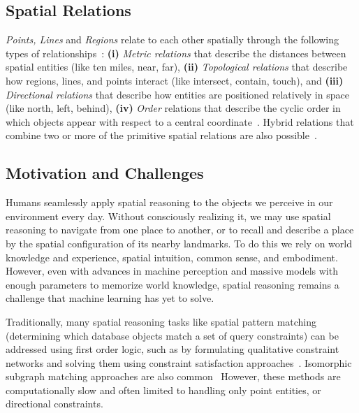 \subsection{Spatial Relations}
\textit{Points, Lines} and \textit{Regions} relate to each other spatially through the following types of relationships~\cite{Carniel2020,Bertella2022,Carniel2023}: 
\textbf{(i)} \textit{Metric relations} that describe the distances between spatial entities (like ten miles, near, far), 
\textbf{(ii)} \textit{Topological relations} that describe how regions, lines, and points interact (like intersect, contain, touch), and 
\textbf{(iii)} \textit{Directional relations} that describe how entities are positioned relatively in space (like north, left, behind),
\textbf{(iv)} \textit{Order} relations that describe the cyclic order in which objects appear with respect to a central coordinate~\cite{Schwering2014}.
%
Hybrid relations that combine two or more of the primitive spatial relations are also possible~\cite{Carniel2023}.



\subsection{Motivation and Challenges}
Humans seamlessly apply spatial reasoning to the objects we perceive in our environment every day.
Without consciously realizing it, we may use spatial reasoning to navigate from one place to another, or to recall and describe a place by the spatial configuration of its nearby landmarks.
To do this we rely on world knowledge and experience, spatial intuition, common sense, and embodiment.
%
%
However, even with advances in machine perception and massive models with enough parameters to memorize world knowledge, spatial reasoning remains a challenge that machine learning has yet to solve.

Traditionally, many spatial reasoning tasks like spatial pattern matching (determining which database objects match a set of query constraints) can be addressed using first order logic, such as by formulating qualitative constraint networks and solving them using constraint satisfaction approaches~\cite{Papadias1998, Schwering2014, Duckham2023}.
Isomorphic subgraph matching approaches are also common~\cite{Folkers2000, Chen2019, Fang2019}
However, these methods are computationally slow and often limited to handling only point entities, or directional constraints.






